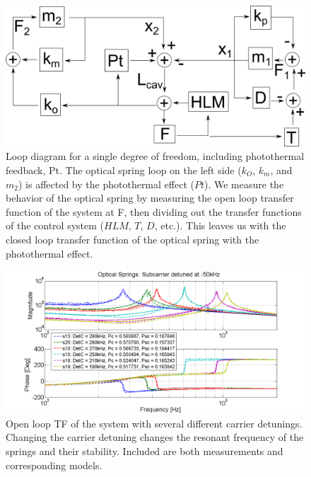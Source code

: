 \begin{figure}[htp]
\begin{center}
\includegraphics[width=.9\textwidth]{figures/controls/photothermal_blocks}
\end{center}
\caption[Loop diagram for a single degree of freedom]{%
\label{fig:photothermal_blocks}
Loop diagram for a single degree of freedom, including photothermal feedback, Pt. The optical spring loop on the left side ($k_O$, $k_m$, and $m_2$) is affected by the photothermal effect ($Pt$). We measure the behavior of the optical spring by measuring the open loop transfer function of the system at F, then dividing out the transfer functions of the control system ($HLM$, $T$, $D$, etc.). This leaves us with the closed loop transfer function of the optical spring with the photothermal effect. }
\end{figure}


\begin{figure}[htbp]
\centering
\includegraphics[width=343pt]{figures/controls/OLG.png}%
\caption{Open loop TF of the system with several different carrier detunings. Changing the carrier detuning changes the resonant frequency of the springs and their stability. Included are both measurements and corresponding models.}%
\label{fig:OLG}%
\end{figure}